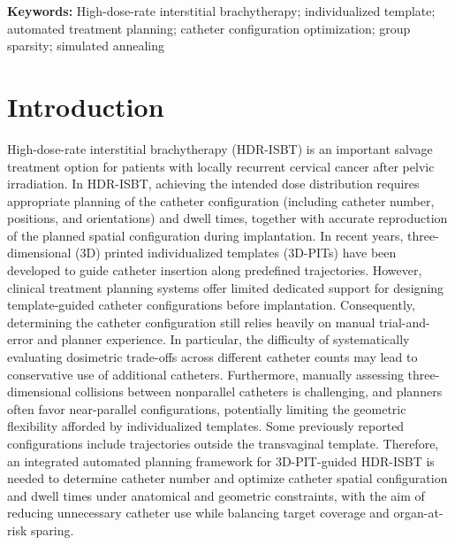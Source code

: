 \documentclass[12pt,twoside,letterpaper]{article}
\begin{document}
{\small\noindent\textbf{Keywords:} High-dose-rate interstitial brachytherapy; individualized template; automated treatment planning; catheter configuration optimization; group sparsity; simulated annealing\par}

\endgroup

\clearpage


\linenumbers

\section{Introduction}\label{sec:1}

High-dose-rate interstitial brachytherapy (HDR-ISBT) is an important salvage treatment option for patients with locally recurrent cervical cancer after pelvic irradiation.\cite{ref1,ref2,ref3,ref4} In HDR-ISBT, achieving the intended dose distribution requires appropriate planning of the catheter configuration (including catheter number, positions, and orientations) and dwell times, together with accurate reproduction of the planned spatial configuration during implantation.\cite{ref5,ref6,ref7,ref8,ref9,ref10,ref11,ref12,ref13} In recent years, three-dimensional (3D) printed individualized templates (3D-PITs) have been developed to guide catheter insertion along predefined trajectories.\cite{ref14,ref15,ref16,ref17,ref18,ref19,ref20,ref21,ref22,ref23,ref24} However, clinical treatment planning systems offer limited dedicated support for designing template-guided catheter configurations before implantation. Consequently, determining the catheter configuration still relies heavily on manual trial-and-error and planner experience. In particular, the difficulty of systematically evaluating dosimetric trade-offs across different catheter counts may lead to conservative use of additional catheters.\cite{ref9,ref10,ref11,ref12,ref25,ref26} Furthermore, manually assessing three-dimensional collisions between nonparallel catheters is challenging, and planners often favor near-parallel configurations, potentially limiting the geometric flexibility afforded by individualized templates. Some previously reported configurations include trajectories outside the transvaginal template.\cite{ref25} Therefore, an integrated automated planning framework for 3D-PIT-guided HDR-ISBT is needed to determine catheter number and optimize catheter spatial configuration and dwell times under anatomical and geometric constraints, with the aim of reducing unnecessary catheter use while balancing target coverage and organ-at-risk sparing.
\end{document}
